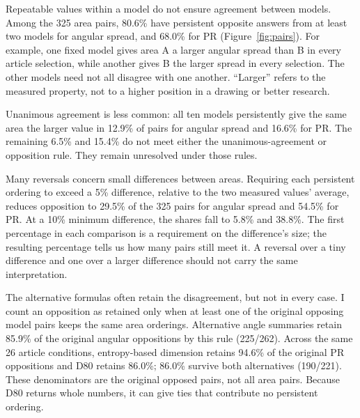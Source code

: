 \documentclass[12pt]{article}
\begin{document}
Repeatable values within a model do not ensure agreement between models. Among the 325 area pairs, 80.6\% have persistent opposite answers from at least two models for angular spread, and 68.0\% for PR (Figure~\ref{fig:pairs}). For example, one fixed model gives area A a larger angular spread than B in every article selection, while another gives B the larger spread in every selection. The other models need not all disagree with one another. ``Larger'' refers to the measured property, not to a higher position in a drawing or better research.

Unanimous agreement is less common: all ten models persistently give the same area the larger value in 12.9\% of pairs for angular spread and 16.6\% for PR. The remaining 6.5\% and 15.4\% do not meet either the unanimous-agreement or opposition rule. They remain unresolved under those rules.

Many reversals concern small differences between areas. Requiring each persistent ordering to exceed a 5\% difference, relative to the two measured values' average, reduces opposition to 29.5\% of the 325 pairs for angular spread and 54.5\% for PR. At a 10\% minimum difference, the shares fall to 5.8\% and 38.8\%. The first percentage in each comparison is a requirement on the difference's size; the resulting percentage tells us how many pairs still meet it. A reversal over a tiny difference and one over a larger difference should not carry the same interpretation.

The alternative formulas often retain the disagreement, but not in every case. I count an opposition as retained only when at least one of the original opposing model pairs keeps the same area orderings. Alternative angle summaries retain 85.9\% of the original angular oppositions by this rule (225/262). Across the same 26 article conditions, entropy-based dimension retains 94.6\% of the original PR oppositions and D80 retains 86.0\%; 86.0\% survive both alternatives (190/221). These denominators are the original opposed pairs, not all area pairs. Because D80 returns whole numbers, it can give ties that contribute no persistent ordering.
\end{document}
